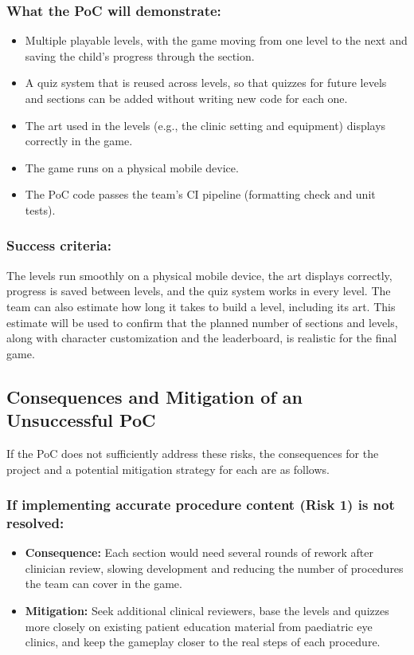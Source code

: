 \documentclass{article}
\begin{document}
\subsubsection*{What the PoC will demonstrate:}
\begin{itemize}
  \item Multiple playable levels, with the game moving from one level to the
  next and saving the child's progress through the section.
  \item A quiz system that is reused across levels, so that quizzes for future
  levels and sections can be added without writing new code for each one.
  \item The art used in the levels (e.g., the clinic setting and equipment)
  displays correctly in the game.
  \item The game runs on a physical mobile device.
  \item The PoC code passes the team's CI pipeline (formatting check and unit
  tests).
\end{itemize}

\subsubsection*{Success criteria:}
The levels run smoothly on a physical mobile device, the art displays
correctly, progress is saved between levels, and the quiz system works in every
level. The team can also estimate how long it takes to build a level, including
its art. This estimate will be used to confirm that
the planned number of sections and levels, along with character customization
and the leaderboard, is realistic for the final game.

\subsection{Consequences and Mitigation of an Unsuccessful PoC}

If the PoC does not sufficiently address these risks, the consequences for the
project and a potential mitigation strategy for each are as follows.

\subsubsection*{If implementing accurate procedure content (Risk 1) is not resolved:}
\begin{itemize}
  \item \textbf{Consequence:} Each section would need several rounds of rework
  after clinician review, slowing development and reducing the number of
  procedures the team can cover in the game.
  \item \textbf{Mitigation:} Seek additional clinical reviewers, base the levels
  and quizzes more closely on existing patient education material from
  paediatric eye clinics, and keep the gameplay closer to the real steps of
  each procedure.
\end{itemize}
\end{document}
